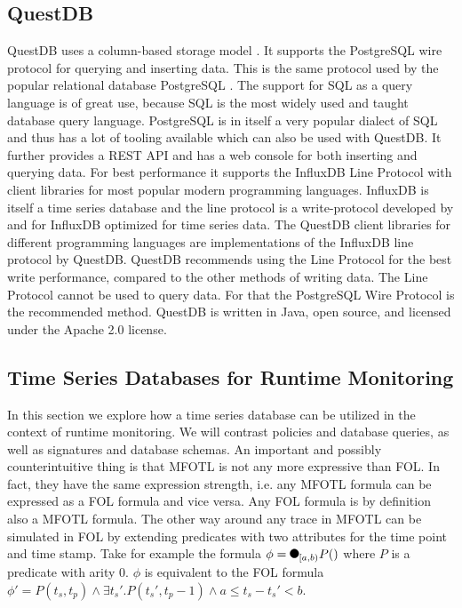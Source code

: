 \subsection{QuestDB}
QuestDB uses a column-based storage model \cite{questdb-storage-model}.
It supports the PostgreSQL wire protocol \cite{questdb-postgres-wire} for querying and inserting data.
This is the same protocol used by the popular relational database PostgreSQL \cite{postgres}.
The support for SQL as a query language is of great use, because SQL is the most widely used and taught database query language.
PostgreSQL is in itself a very popular dialect of SQL and thus has a lot of tooling available which can also be used with QuestDB.
It further provides a REST API \cite{questdb-rest} and has a web console for both inserting and querying data.
For best performance it supports the InfluxDB Line Protocol \cite{questdb-influx-db-line-protocol, influx-line} with client libraries for most popular modern programming languages.
InfluxDB is itself a time series database and the line protocol is a write-protocol developed by and for InfluxDB optimized for time series data.
The QuestDB client libraries for different programming languages are implementations of the InfluxDB line protocol by QuestDB.
QuestDB recommends using the Line Protocol for the best write performance, compared to the other methods of writing data.
The Line Protocol cannot be used to query data.
For that the PostgreSQL Wire Protocol is the recommended method.
QuestDB is written in Java, open source, and licensed under the Apache 2.0 license.

\subsection{Time Series Databases for Runtime Monitoring}
In this section we explore how a time series database can be utilized in the context of runtime monitoring.
We will contrast policies and database queries, as well as signatures and database schemas.
An important and possibly counterintuitive thing is that MFOTL is not any more expressive than FOL.
In fact, they have the same expression strength, i.e. any MFOTL formula can be expressed as a FOL formula and vice versa.
Any FOL formula is by definition also a MFOTL formula.
The other way around any trace in MFOTL can be simulated in FOL by extending predicates with two attributes for the time point and time stamp.
Take for example the formula $\phi = \Previous{[a,b)} P()$ where $P$ is a predicate with arity $0$.
$\phi$ is equivalent to the FOL formula $\phi' = P(t_s, t_p) \land \exists t_s' . P(t_s', t_p - 1) \land a \leq t_s - t_s' < b$.

